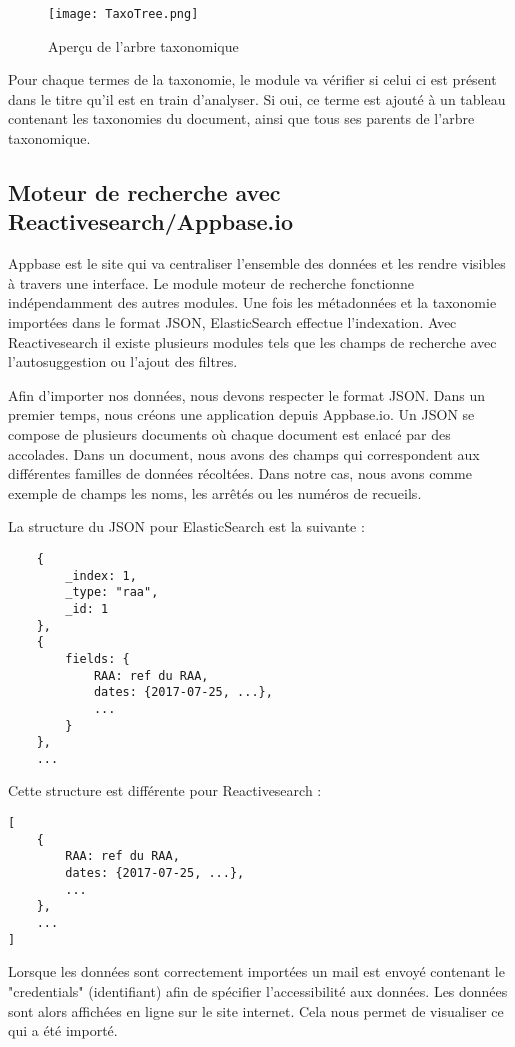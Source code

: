 \begin{figure}[h!]
  \centering
  \texttt{[image: TaxoTree.png]}
	\caption[]{Aperçu de l'arbre taxonomique}
  \label{fig:tree}
\end{figure}

Pour chaque termes de la taxonomie, le module va vérifier si celui ci est présent dans le titre qu'il est en train d'analyser.
Si oui, ce terme est ajouté à un tableau contenant les taxonomies du document, ainsi que tous ses parents de l'arbre taxonomique.


\subsection{Moteur de recherche avec Reactivesearch/Appbase.io}
Appbase est le site qui va centraliser l'ensemble des données et les rendre visibles à travers une interface.
Le module moteur de recherche fonctionne indépendamment des autres modules. Une fois les métadonnées et la taxonomie importées dans le format JSON, ElasticSearch effectue l'indexation.
Avec Reactivesearch il existe plusieurs modules tels que les champs de recherche avec l'autosuggestion ou l'ajout des filtres.  

Afin d'importer nos données, nous devons respecter le format JSON\@.
Dans un premier temps, nous créons une application depuis Appbase.io. 
Un JSON se compose de plusieurs documents où chaque document est enlacé par des accolades.
Dans un document, nous avons des champs qui correspondent aux différentes familles de données récoltées.
Dans notre cas, nous avons comme exemple de champs les noms, les arrêtés ou les numéros de recueils.

La structure du JSON pour ElasticSearch est la suivante :
\begin{lstlisting}
	{
		_index: 1,
		_type: "raa",
		_id: 1
	},
	{	
		fields: {
			RAA: ref du RAA,
			dates: {2017-07-25, ...},
			...
		}
	},
	...
\end{lstlisting}

Cette structure est différente pour Reactivesearch :
\begin{lstlisting}
[
	{
		RAA: ref du RAA,
		dates: {2017-07-25, ...},
		...
	}, 
	...
]
\end{lstlisting}

Lorsque les données sont correctement importées un mail est envoyé contenant le "credentials" (identifiant) afin de spécifier l'accessibilité aux données.
Les données sont alors affichées en ligne sur le site internet.
Cela nous permet de visualiser ce qui a été importé. 

